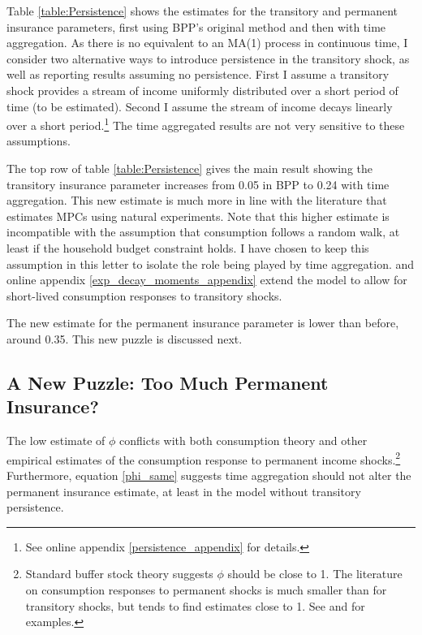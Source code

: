 \documentclass[AER]{AEA}
\begin{document}
Table \ref{table:Persistence} shows the estimates for the transitory and permanent insurance parameters, first using BPP's original method and then with time aggregation. As there is no equivalent to an MA(1) process in continuous time, I consider two alternative ways to introduce persistence in the transitory shock, as well as reporting results assuming no persistence. First I assume a transitory shock provides a stream of income uniformly distributed over a short period of time (to be estimated). Second I assume the stream of income decays linearly over a short period.\footnote{See online appendix \ref{persistence_appendix} for details.} The time aggregated results are not very sensitive to these assumptions.

The top row of table \ref{table:Persistence} gives the main result showing the transitory insurance parameter increases from 0.05 in BPP to 0.24 with time aggregation. This new estimate is much more in line with the literature that estimates MPCs using natural experiments. Note that this higher estimate is incompatible with the assumption that consumption follows a random walk, at least if the household budget constraint holds. I have chosen to keep this assumption in this letter to isolate the role being played by time aggregation. \cite{crawley_consumption_2018} and online appendix \ref{exp_decay_moments_appendix} extend the model to allow for short-lived consumption responses to transitory shocks.

The new estimate for the permanent insurance parameter is lower than before, around 0.35. This new puzzle is discussed next.

\subsection{A New Puzzle: Too Much Permanent Insurance?}
The low estimate of $\phi$ conflicts with both consumption theory and other empirical estimates of the consumption response to permanent income shocks.\footnote{Standard buffer stock theory suggests $\phi$ should be close to 1. The literature on consumption responses to permanent shocks is much smaller than for transitory shocks, but tends to find estimates close to 1. See  \cite{gelman_response_2016} and \cite{crawley_consumption_2018} for examples.} Furthermore, equation \ref{phi_same} suggests time aggregation should not alter the permanent insurance estimate, at least in the model without transitory persistence. 
\end{document}
